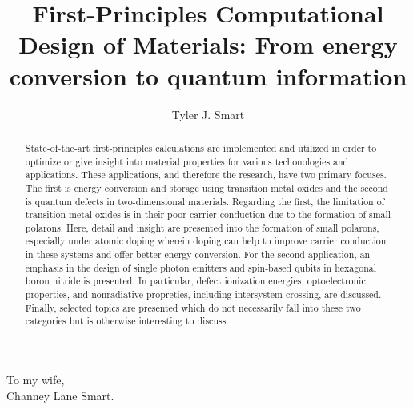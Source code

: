 \documentclass[12pt]{../include/ucthesis}
\begin{document}
\title{First-Principles Computational Design of Materials: From energy conversion to quantum information}
\author{Tyler J. Smart}
\deanlinethree{}

\begin{frontmatter}
\maketitle

\copyrightpage

\tableofcontents

\listoffigures

\listoftables

\begin{abstract}
    State-of-the-art first-principles calculations are implemented and utilized in order to optimize or give insight into material properties for various techonologies and applications. These applications, and therefore the research, have two primary focuses. The first is energy conversion and storage using transition metal oxides and the second is quantum defects in two-dimensional materials. Regarding the first, the limitation of transition metal oxides is in their poor carrier conduction due to the formation of small polarons. Here, detail and insight are presented into the formation of small polarons, especially under atomic doping wherein doping can help to improve carrier conduction in these systems and offer better energy conversion. For the second application, an emphasis in the design of single photon emitters and spin-based qubits in hexagonal boron nitride is presented. In particular, defect ionization energies, optoelectronic properties, and nonradiative propreties, including intersystem crossing, are discussed. Finally, selected topics are presented which do not necessarily fall into these two categories but is otherwise interesting to discuss.
\end{abstract}

\begin{dedication}
\vspace*{\fill}
\begin{center}
    To my wife, \\
    Channey Lane Smart.
\end{center}
\vspace*{\fill}
\end{dedication}


\end{frontmatter}
\end{document}
